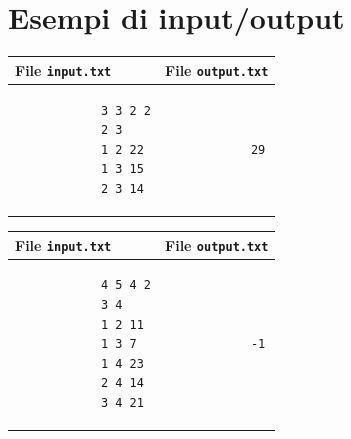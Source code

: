 \documentclass[a4paper,11pt]{article}
\begin{document}
\section*{Esempi di input/output}
    \noindent
    \begin{tabular}{p{11cm}|p{5cm}}
    \toprule
    \textbf{File \texttt{input.txt}}
    & \textbf{File \texttt{output.txt}}
    \\
    \midrule
    \scriptsize
    \begin{verbatim}
            3 3 2 2
            2 3
            1 2 22
            1 3 15
            2 3 14
            \end{verbatim}
    &
    \scriptsize
    \begin{verbatim}
            29
            \end{verbatim}
    \\
    \bottomrule
    \end{tabular}
  
    \noindent
    \begin{tabular}{p{11cm}|p{5cm}}
    \toprule
    \textbf{File \texttt{input.txt}}
    & \textbf{File \texttt{output.txt}}
    \\
    \midrule
    \scriptsize
    \begin{verbatim}
            4 5 4 2
            3 4
            1 2 11
            1 3 7
            1 4 23
            2 4 14
            3 4 21
            \end{verbatim}
    &
    \scriptsize
    \begin{verbatim}
            -1
            \end{verbatim}
    \\
    \bottomrule
    \end{tabular}
\end{document}
